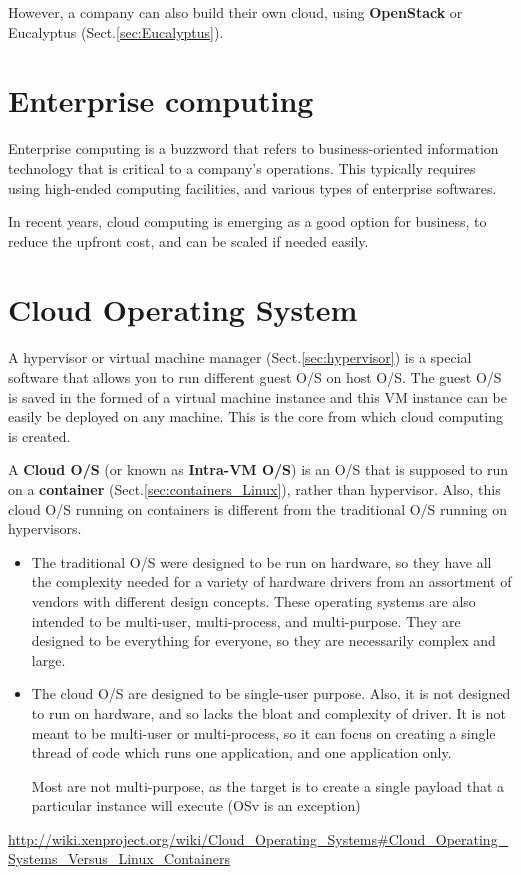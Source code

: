 However, a company can also build their own cloud, using {\bf OpenStack} or
Eucalyptus (Sect.\ref{sec:Eucalyptus}).

\section{Enterprise computing}
\label{sec:enterprise-computing}	


Enterprise computing is a buzzword that refers to business-oriented information
technology that is critical to a company's operations. This typically requires
using high-ended computing facilities, and various types of enterprise
softwares.

In recent years, cloud computing is emerging as a good option for business, to
reduce the upfront cost, and can be scaled if needed easily.

\section{Cloud Operating System}

A hypervisor or virtual machine manager (Sect.\ref{sec:hypervisor}) 
is a special software that allows you to run different guest O/S on host O/S.
The guest O/S is saved in the formed of a virtual machine instance and this
VM instance can be easily be deployed on any machine. This is the core from
which cloud computing is created.

A {\bf Cloud O/S} (or known as {\bf Intra-VM O/S}) is an O/S that is supposed to
run on a {\bf container} (Sect.\ref{sec:containers_Linux}), rather than
hypervisor. Also, this cloud O/S running on containers is different from the
traditional O/S running on hypervisors.
\begin{itemize}
  \item  The traditional O/S were designed to be run on hardware,
  so they have all the complexity needed for a variety of hardware drivers from
  an assortment of vendors with different design concepts. These operating
  systems are also intended to be multi-user, multi-process, and multi-purpose.
  They are designed to be everything for everyone, so they are necessarily
  complex and large.

  \item The cloud O/S are designed to be single-user purpose. Also, it is not
  designed to run on hardware, and so lacks the bloat and complexity of driver.
  It is not meant to be multi-user or multi-process, so it can focus on creating
  a single thread of code which runs one application, and one application only.
  
  Most are not multi-purpose, as the target is to create a single payload that a
  particular instance will execute (OSv is an exception)
  
\end{itemize}
\url{http://wiki.xenproject.org/wiki/Cloud_Operating_Systems#Cloud_Operating_Systems_Versus_Linux_Containers}


